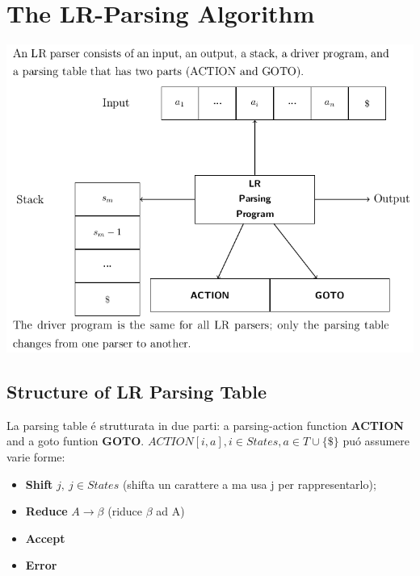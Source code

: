 \section{The LR-Parsing Algorithm}
\begin{center}
    \includegraphics[scale=0.6]{Chapters/Img/c04_08.png}\\
\end{center}

\subsection{Structure of LR Parsing Table}
La parsing table \'e strutturata in due parti: a parsing-action function \textbf{ACTION} and a goto funtion \textbf{GOTO}.
$ACTION[i,a], i \in States, a \in T \cup \{\$\}$ pu\'o assumere varie forme:

\begin{itemize}
    \item \textbf{Shift} $j,\ j \in States$ (shifta un carattere a ma usa j per rappresentarlo);\\
    \item \textbf{Reduce} $A \rightarrow \beta$ (riduce $\beta$ ad A)\\
    \item \textbf{Accept} \\
    \item \textbf{Error}\\
\end{itemize}

